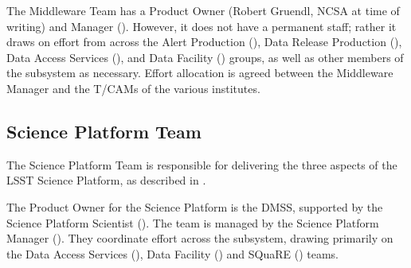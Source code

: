 The Middleware Team has a Product Owner (Robert Gruendl, NCSA at time of writing) and Manager ().
However, it does not have a permanent staff; rather it draws on effort from across the Alert Production (), Data Release Production (), Data Access Services (), and Data Facility () groups, as well as other members of the subsystem as necessary.
Effort allocation is agreed between the Middleware Manager and the T/CAMs of the various institutes.

\subsection{Science Platform Team \label{sec:sciplat}}

The Science Platform Team is responsible for delivering the three aspects of the LSST Science Platform, as described in .

The Product Owner for the Science Platform is the \gls{DMSS}, supported by the Science Platform Scientist ().
The team is managed by the Science Platform Manager ().
They coordinate effort across the subsystem, drawing primarily on the Data Access Services (), Data Facility () and SQuaRE () teams.
